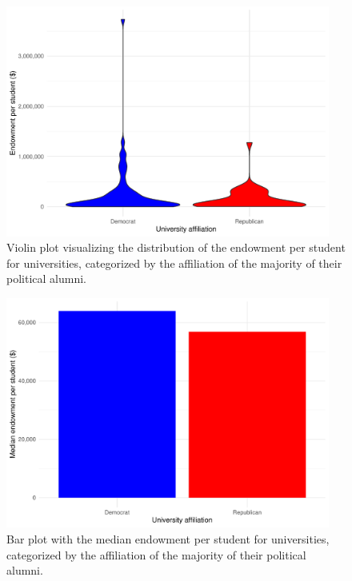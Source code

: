 \documentclass{article}
\begin{document}
\begin{figure}[b]
    \centering
    \includegraphics[width=0.95\textwidth]{images/5 endowment_per_university_affiliation_violin_plot.pdf}
    \caption{Violin plot visualizing the distribution of the endowment per student for universities, categorized by the affiliation of the majority of their political alumni.}
    \label{fig:5}
\end{figure}

\begin{figure}[b]
    \centering
    \includegraphics[width=0.95\textwidth]{images/6 endowment_per_university_affiliation_median.pdf}
    \caption{Bar plot with the median endowment per student for universities, categorized by the affiliation of the majority of their political alumni.}
    \label{fig:6}
\end{figure}
\end{document}

